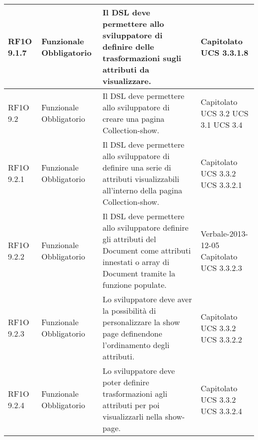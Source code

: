 \begin{center}
\begin{longtable}{ | l | p{2cm} | p{5cm} | p{1.7cm} |}
        RF1O 9.1.7 & Funzionale \newline  Obbligatorio  & Il DSL deve permettere allo sviluppatore di definire delle trasformazioni sugli attributi da visualizzare. &  Capitolato \newline  UCS 3.3.1.8 \newline  \\ \hline      
        RF1O 9.2 & Funzionale \newline  Obbligatorio  & Il DSL deve permettere allo sviluppatore di creare una pagina Collection-show. &  Capitolato \newline  UCS 3.2 \newline  UCS 3.1 \newline  UCS 3.4 \newline  \\ \hline      
        RF1O 9.2.1 & Funzionale \newline  Obbligatorio  & Il DSL deve permettere allo sviluppatore di definire una serie di attributi visualizzabili all’interno della pagina Collection-show. &  Capitolato \newline  UCS 3.3.2 \newline  UCS 3.3.2.1 \newline  \\ \hline      
        RF1O 9.2.2 & Funzionale \newline  Obbligatorio  & Il DSL deve permettere allo sviluppatore definire gli attributi del Document come attributi innestati o array di Document tramite la funzione populate. &  Verbale-2013-12-05 \newline  Capitolato \newline  UCS 3.3.2.3 \newline  \\ \hline      
        RF1O 9.2.3 & Funzionale \newline  Obbligatorio  & Lo sviluppatore deve aver la possibilità di personalizzare la show page definendone l’ordinamento degli attributi. &  Capitolato \newline  UCS 3.3.2 \newline  UCS 3.3.2.2 \newline  \\ \hline      
        RF1O 9.2.4 & Funzionale \newline  Obbligatorio  & Lo sviluppatore deve poter definire trasformazioni agli attributi per poi visualizzarli nella show-page. &  Capitolato \newline  UCS 3.3.2 \newline  UCS 3.3.2.4 \newline  \\ \hline      

\end{longtable}
\end{center}
